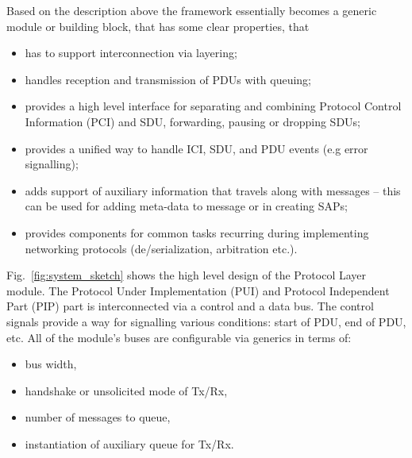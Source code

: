 \documentclass[journal]{IEEEtran}
\begin{document}
Based on the description above the framework essentially becomes a generic module or building block, that has some
clear properties, that
\begin{itemize}
    \renewcommand \labelitemi{--}
    \item has to support interconnection via layering;
    \item handles reception and transmission of PDUs with queuing;
    \item provides a high level interface for separating and combining  Protocol Control Information (PCI) and SDU,
          forwarding, pausing or dropping SDUs;
    \item provides a unified way to handle ICI, SDU, and PDU events (e.g error signalling);
    \item adds support of auxiliary information that travels along with messages -- this can be used for adding
          meta-data to message or in creating SAPs;
    \item provides components for common tasks recurring during implementing networking protocols
          (de/serialization, arbitration etc.).
\end{itemize}

Fig.~\ref{fig:system_sketch} shows the high level design of the Protocol Layer module. The Protocol Under Implementation (PUI) and Protocol Independent Part (PIP) part is
interconnected via a control and a data bus. The control signals provide a way for signalling various conditions: start
of PDU, end of PDU, etc. All of the module's buses are configurable via generics in terms of:
\begin{itemize}
    \renewcommand \labelitemi{--}
    \item bus width,
    \item handshake or unsolicited mode of Tx/Rx,
    \item number of messages to queue,
    \item instantiation of auxiliary queue for Tx/Rx.
\end{itemize}
\end{document}
